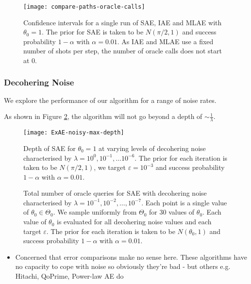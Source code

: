 \begin{figure}[htbp]
	\centering
	\texttt{[image: compare-paths-oracle-calls]}
	\caption{Confidence intervals for a single run of SAE, IAE and MLAE with $\theta_0 = 1$. The prior for SAE is taken to be $N(\pi/2, 1)$ and success probability $1 - \alpha$ with $\alpha = 0.01$. As IAE and MLAE use a fixed number of shots per step, the number of oracle calls does not start at 0.}
	\label{fig::compare-paths-oracle-calls}
\end{figure}

\subsubsection{Decohering Noise}
We explore the performance of our algorithm for a range of noise rates.

As shown in Figure \ref{fig::ExAE-noisy-max-depth}, the algorithm will not go beyond a depth of $\sim \frac{1}{\lambda}$. 

\begin{figure}[htbp]
	\centering
	\texttt{[image: ExAE-noisy-max-depth]}
	\caption{Depth of SAE for $\theta_0 = 1$ at varying levels of decohering noise characterised by $\lambda = 10^0, 10^{-1}, \ldots 10^{-6}$. The prior for each iteration is taken to be $N(\pi /2, 1)$, we target $\varepsilon = 10^{-3}$ and success probability $1 - \alpha$ with $\alpha = 0.01$.}
	\label{fig::ExAE-noisy-max-depth}
\end{figure}

\begin{figure}[htbp]
	\centering
	\caption{Total number of oracle queries for SAE with decohering noise characterised by $\lambda = 10^{-1}, 10^{-2}, \ldots, 10^{-7}$. Each point is a single value of $\theta_0 \in \Theta_0$. We sample uniformly from $\Theta_0$ for 30 values of $\theta_0$. Each value of $\theta_0$ is evaluated for all decohering noise values and each target $\varepsilon$. The prior for each iteration is taken to be $N(\theta_0, 1)$ and success probability $1 - \alpha$ with $\alpha = 0.01$.}
	\label{fig::query-exae-noisy}
\end{figure}

\begin{itemize}
	\color{red}
	\item Concerned that error comparisons make no sense here. These algorithms have no capacity to cope with noise so obviously they're bad - but others e.g. Hitachi, QoPrime, Power-law AE do
\end{itemize}

